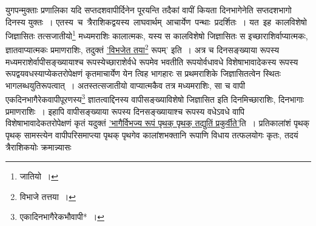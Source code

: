 \documentclass[10pt, openany]{book}
\begin{document}
{{\newpage

{युगपन्मुक्ताः प्रणालिका यदि सप्तदशवापीर्दिनेन पूरयन्ति तदैकां वापीं
कियता दिनभागेनेति}
{सप्तदशभागो दिनस्य युक्तः~। एतस्य \,च \,त्रैराशिकद्वयस्य \,लाघवार्थम् \,आचार्येण \,पन्थाः \,प्रदर्शितः~। यत \,इह \,कालविशेषो जिज्ञासितः तत्सजातीयो\renewcommand{\thefootnote}{\s २}\footnote{\s *जातियो~।} मध्यमराशिः
कालात्मकः,} 
{यस्य स कालविशेषो जिज्ञासितः स इच्छाराशिर्वाप्यात्मकः, ज्ञातवाप्यात्मकः
प्रमाणराशिः,}
{तदुक्तं \hyperref[69]{'विभजेत तया\renewcommand{\thefootnote}{\s ३}\footnote{\s विभाजे तत्तया~।} रूपम्'} इति~। अत्र च दिनसङ्ख्याया रूपस्य
मध्यमराशेर्वापीसङ्ख्यायाश्च रूपस्येच्छाराशेर्वधे रूपमेव भवतीति रूपयोर्वधावधे
विशेषाभावादेकस्य}
{रूपस्य रूपद्वयवधस्याप्येकतरोपेक्षणं कृतमाचार्येण येन त्विह भागहारः स
प्रथमराशिके}
{जिज्ञासितत्वेन स्थितः भागलब्धयुतिरूपत्वात्~। अतस्तत्सजातीयो
वाप्यात्मकैव तत्र मध्यमराशिः,}
{सा च वापी एकदिनभागैरेकवापीपूरणस्य\renewcommand{\thefootnote}{\s ४}\footnote{\s एकादिनभागैरेकभौवापी*~।} ज्ञातत्वाद्दिनस्य
वापीसङ्ख्याविशेषो जिज्ञासित इति}
{दिनमिच्छाराशिः, दिनभागाः प्रमाणराशिः~। इहापि वापीसङ्ख्याया रूपस्य
दिनसङ्ख्यायाश्च}
{रूपस्य वधेऽवधे वापि विशेषाभावादेकतरोपेक्षणं कृतं यदुक्तं \hyperref[69]{'भागैर्विभज्य रूपं पृथक् पृथक् तद्युतिं प्रकुर्वीते'}ति~। प्रतिकालांशं पृथक् पृथक् सामस्त्येन
वापीपरिसमाप्त्या पृथक् पृथगेव}
{कालांशभक्तानि रूपाणि विधाय तत्फलयोगः कृतः, तदयं त्रैराशिकयोः
क्रमान्न्यासः\textemdash
}

}}
\end{document}
